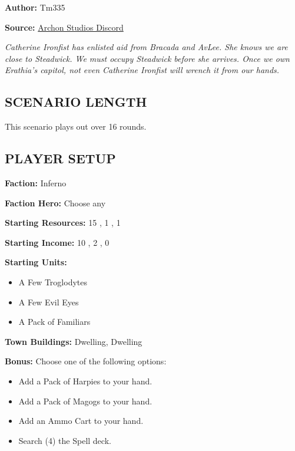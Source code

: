 
\begin{multicols*}{2}

\textbf{Author:} Tm335

\textbf{Source:} \href{https://discord.com/channels/740870068178649108/1246353361456861276/1246353361456861276}{Archon Studios Discord}

\textit{Catherine Ironfist has enlisted aid from Bracada and AvLee.
She knows we are close to Steadwick.
We must occupy Steadwick before she arrives.
Once we own Erathia's capitol, not even Catherine Ironfist will wrench it from our hands.}

\subsection*{\MakeUppercase{Scenario length}}

This scenario plays out over 16 rounds.

\subsection*{\MakeUppercase{Player setup}}

\textbf{Faction:} Inferno

\textbf{Faction Hero:} Choose any

\textbf{Starting Resources:} 15 , 1 , 1 

\textbf{Starting Income:} 10 , 2 , 0 

\textbf{Starting Units:}

\begin{itemize}
  \item A Few Troglodytes
  \item A Few Evil Eyes
  \item A Pack of Familiars
\end{itemize}

\textbf{Town Buildings:}  Dwelling,  Dwelling

\vspace*{\fill}\columnbreak

\textbf{Bonus:} Choose one of the following options:
\begin{itemize}
  \item Add a Pack of Harpies to your hand.
  \item Add a Pack of Magogs to your hand.
  \item Add an Ammo Cart to your hand.
  \item Search (4) the Spell deck.
\end{itemize}


\end{multicols*}
